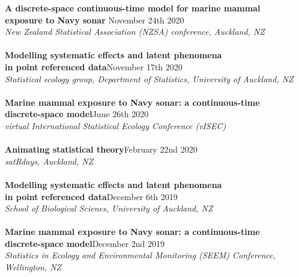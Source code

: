 \documentclass[10pt,letter]{article}
\begin{document}
{\textbf{A discrete-space continuous-time model for marine mammal \\
           exposure to Navy sonar }}\hfill November 24th 2020\\
       {\sl New Zealand Statistical Association (NZSA) conference, Auckland, NZ}\\
       \hdashrule[0.5ex]{4cm}{1pt}{1pt}\\
{\textbf{Modelling systematic effects and latent phenomena \\
                     in point referenced data}}\hfill November 17th 2020\\
                 {\sl Statistical ecology group, Department of Statistics, University of Auckland, NZ}\\
                 \hdashrule[0.5ex]{4cm}{1pt}{1pt}\\
{\textbf{Marine mammal exposure to Navy sonar: a continuous-time \\
                     discrete-space model}}\hfill June 26th 2020\\
                 {\sl virtual International Statistical Ecology Conference (vISEC)}\\
                 \hdashrule[0.5ex]{4cm}{1pt}{1pt}\\
                           {\textbf{Animating statistical theory}}\hfill February 22nd 2020\\
                           {\sl satRdays, Auckland, NZ}\\
                           \hdashrule[0.5ex]{4cm}{1pt}{1pt}\\
                           {\textbf{Modelling systematic effects and latent phenomena \\
                                         in point referenced data}}\hfill December 6th 2019\\
                                     {\sl School of Biological Scienes, University of Auckland, NZ}\\
                                     \hdashrule[0.5ex]{4cm}{1pt}{1pt}\\
                                               {\textbf{Marine mammal exposure to Navy sonar: a continuous-time \\
                                                   discrete-space model}}\hfill December 2nd 2019\\
                                               {\sl Statistics in Ecology and Environmental Monitoring (SEEM) Conference, Wellington, NZ}\\
\end{document}
